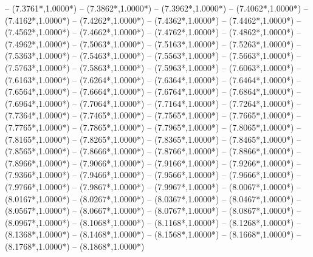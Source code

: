 {	-- ({7.3761*\dx},{1.0000*\dy})
	-- ({7.3862*\dx},{1.0000*\dy})
	-- ({7.3962*\dx},{1.0000*\dy})
	-- ({7.4062*\dx},{1.0000*\dy})
	-- ({7.4162*\dx},{1.0000*\dy})
	-- ({7.4262*\dx},{1.0000*\dy})
	-- ({7.4362*\dx},{1.0000*\dy})
	-- ({7.4462*\dx},{1.0000*\dy})
	-- ({7.4562*\dx},{1.0000*\dy})
	-- ({7.4662*\dx},{1.0000*\dy})
	-- ({7.4762*\dx},{1.0000*\dy})
	-- ({7.4862*\dx},{1.0000*\dy})
	-- ({7.4962*\dx},{1.0000*\dy})
	-- ({7.5063*\dx},{1.0000*\dy})
	-- ({7.5163*\dx},{1.0000*\dy})
	-- ({7.5263*\dx},{1.0000*\dy})
	-- ({7.5363*\dx},{1.0000*\dy})
	-- ({7.5463*\dx},{1.0000*\dy})
	-- ({7.5563*\dx},{1.0000*\dy})
	-- ({7.5663*\dx},{1.0000*\dy})
	-- ({7.5763*\dx},{1.0000*\dy})
	-- ({7.5863*\dx},{1.0000*\dy})
	-- ({7.5963*\dx},{1.0000*\dy})
	-- ({7.6063*\dx},{1.0000*\dy})
	-- ({7.6163*\dx},{1.0000*\dy})
	-- ({7.6264*\dx},{1.0000*\dy})
	-- ({7.6364*\dx},{1.0000*\dy})
	-- ({7.6464*\dx},{1.0000*\dy})
	-- ({7.6564*\dx},{1.0000*\dy})
	-- ({7.6664*\dx},{1.0000*\dy})
	-- ({7.6764*\dx},{1.0000*\dy})
	-- ({7.6864*\dx},{1.0000*\dy})
	-- ({7.6964*\dx},{1.0000*\dy})
	-- ({7.7064*\dx},{1.0000*\dy})
	-- ({7.7164*\dx},{1.0000*\dy})
	-- ({7.7264*\dx},{1.0000*\dy})
	-- ({7.7364*\dx},{1.0000*\dy})
	-- ({7.7465*\dx},{1.0000*\dy})
	-- ({7.7565*\dx},{1.0000*\dy})
	-- ({7.7665*\dx},{1.0000*\dy})
	-- ({7.7765*\dx},{1.0000*\dy})
	-- ({7.7865*\dx},{1.0000*\dy})
	-- ({7.7965*\dx},{1.0000*\dy})
	-- ({7.8065*\dx},{1.0000*\dy})
	-- ({7.8165*\dx},{1.0000*\dy})
	-- ({7.8265*\dx},{1.0000*\dy})
	-- ({7.8365*\dx},{1.0000*\dy})
	-- ({7.8465*\dx},{1.0000*\dy})
	-- ({7.8565*\dx},{1.0000*\dy})
	-- ({7.8666*\dx},{1.0000*\dy})
	-- ({7.8766*\dx},{1.0000*\dy})
	-- ({7.8866*\dx},{1.0000*\dy})
	-- ({7.8966*\dx},{1.0000*\dy})
	-- ({7.9066*\dx},{1.0000*\dy})
	-- ({7.9166*\dx},{1.0000*\dy})
	-- ({7.9266*\dx},{1.0000*\dy})
	-- ({7.9366*\dx},{1.0000*\dy})
	-- ({7.9466*\dx},{1.0000*\dy})
	-- ({7.9566*\dx},{1.0000*\dy})
	-- ({7.9666*\dx},{1.0000*\dy})
	-- ({7.9766*\dx},{1.0000*\dy})
	-- ({7.9867*\dx},{1.0000*\dy})
	-- ({7.9967*\dx},{1.0000*\dy})
	-- ({8.0067*\dx},{1.0000*\dy})
	-- ({8.0167*\dx},{1.0000*\dy})
	-- ({8.0267*\dx},{1.0000*\dy})
	-- ({8.0367*\dx},{1.0000*\dy})
	-- ({8.0467*\dx},{1.0000*\dy})
	-- ({8.0567*\dx},{1.0000*\dy})
	-- ({8.0667*\dx},{1.0000*\dy})
	-- ({8.0767*\dx},{1.0000*\dy})
	-- ({8.0867*\dx},{1.0000*\dy})
	-- ({8.0967*\dx},{1.0000*\dy})
	-- ({8.1068*\dx},{1.0000*\dy})
	-- ({8.1168*\dx},{1.0000*\dy})
	-- ({8.1268*\dx},{1.0000*\dy})
	-- ({8.1368*\dx},{1.0000*\dy})
	-- ({8.1468*\dx},{1.0000*\dy})
	-- ({8.1568*\dx},{1.0000*\dy})
	-- ({8.1668*\dx},{1.0000*\dy})
	-- ({8.1768*\dx},{1.0000*\dy})
	-- ({8.1868*\dx},{1.0000*\dy})
}
